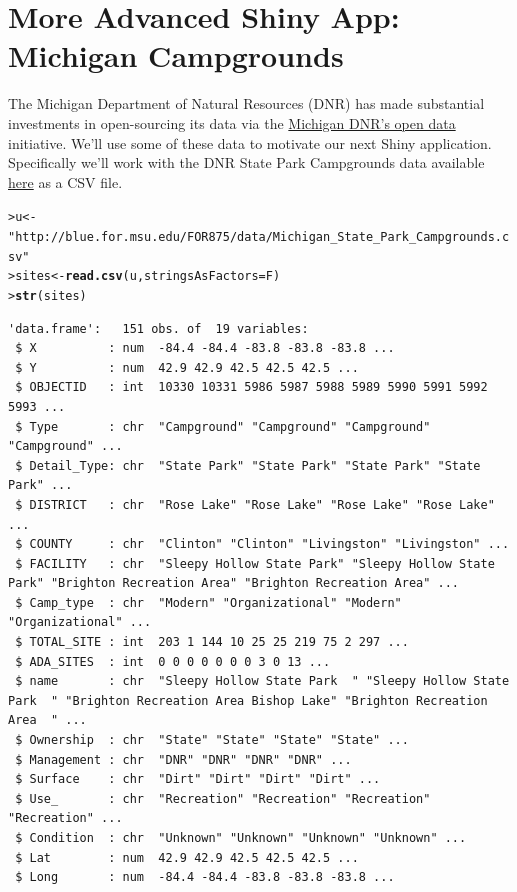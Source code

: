\documentclass[12pt,oneside]{book}\usepackage[]{graphicx}\usepackage[]{color}
\makeatletter
\newcommand{\hlstr}[1]{\textcolor[rgb]{0.192,0.494,0.8}{#1}}%
\newcommand{\hlstd}[1]{\textcolor[rgb]{0.345,0.345,0.345}{#1}}%
\newcommand{\hlkwb}[1]{\textcolor[rgb]{0.69,0.353,0.396}{#1}}%
\newcommand{\hlkwc}[1]{\textcolor[rgb]{0.333,0.667,0.333}{#1}}%
\newcommand{\hlkwd}[1]{\textcolor[rgb]{0.737,0.353,0.396}{\textbf{#1}}}%
\newenvironment{kframe}{%
 \def\at@end@of@kframe{}%
 \ifinner\ifhmode%
  \def\at@end@of@kframe{\end{minipage}}%
  \begin{minipage}{\columnwidth}%
 \fi\fi%
 \def\FrameCommand##1{\hskip\@totalleftmargin \hskip-\fboxsep
 \colorbox{shadecolor}{##1}\hskip-\fboxsep
     \hskip-\linewidth \hskip-\@totalleftmargin \hskip\columnwidth}%
 \MakeFramed {\advance\hsize-\width
   \@totalleftmargin\z@ \linewidth\hsize
   \@setminipage}}%
 {\par\unskip\endMakeFramed%
 \at@end@of@kframe}
\newenvironment{knitrout}{}{} %
\makeatother
\begin{document}
\section{More Advanced Shiny App: Michigan Campgrounds}

The Michigan Department of Natural Resources (DNR) has made substantial investments in open-sourcing its data via the \href{http://gis-midnr.opendata.arcgis.com/datasets/}{Michigan DNR's open data} initiative. We'll use some of these data to motivate our next Shiny application. Specifically we'll work with the DNR State Park Campgrounds data available \href{http://blue.for.msu.edu/FOR875/data/Michigan_State_Park_Campgrounds.csv}{here} as a CSV file.

\begin{knitrout}
\color{fgcolor}\begin{kframe}
\begin{alltt}
\hlstd{> }\hlstd{u} \hlkwb{<-} \hlstr{"http://blue.for.msu.edu/FOR875/data/Michigan_State_Park_Campgrounds.csv"}
\hlstd{> }\hlstd{sites} \hlkwb{<-} \hlkwd{read.csv}\hlstd{(u,} \hlkwc{stringsAsFactors} \hlstd{= F)}
\hlstd{> }\hlkwd{str}\hlstd{(sites)}
\end{alltt}
\begin{verbatim}
'data.frame':	151 obs. of  19 variables:
 $ X          : num  -84.4 -84.4 -83.8 -83.8 -83.8 ...
 $ Y          : num  42.9 42.9 42.5 42.5 42.5 ...
 $ OBJECTID   : int  10330 10331 5986 5987 5988 5989 5990 5991 5992 5993 ...
 $ Type       : chr  "Campground" "Campground" "Campground" "Campground" ...
 $ Detail_Type: chr  "State Park" "State Park" "State Park" "State Park" ...
 $ DISTRICT   : chr  "Rose Lake" "Rose Lake" "Rose Lake" "Rose Lake" ...
 $ COUNTY     : chr  "Clinton" "Clinton" "Livingston" "Livingston" ...
 $ FACILITY   : chr  "Sleepy Hollow State Park" "Sleepy Hollow State Park" "Brighton Recreation Area" "Brighton Recreation Area" ...
 $ Camp_type  : chr  "Modern" "Organizational" "Modern" "Organizational" ...
 $ TOTAL_SITE : int  203 1 144 10 25 25 219 75 2 297 ...
 $ ADA_SITES  : int  0 0 0 0 0 0 0 3 0 13 ...
 $ name       : chr  "Sleepy Hollow State Park  " "Sleepy Hollow State Park  " "Brighton Recreation Area Bishop Lake" "Brighton Recreation Area  " ...
 $ Ownership  : chr  "State" "State" "State" "State" ...
 $ Management : chr  "DNR" "DNR" "DNR" "DNR" ...
 $ Surface    : chr  "Dirt" "Dirt" "Dirt" "Dirt" ...
 $ Use_       : chr  "Recreation" "Recreation" "Recreation" "Recreation" ...
 $ Condition  : chr  "Unknown" "Unknown" "Unknown" "Unknown" ...
 $ Lat        : num  42.9 42.9 42.5 42.5 42.5 ...
 $ Long       : num  -84.4 -84.4 -83.8 -83.8 -83.8 ...
\end{verbatim}
\end{kframe}
\end{knitrout}
\end{document}
